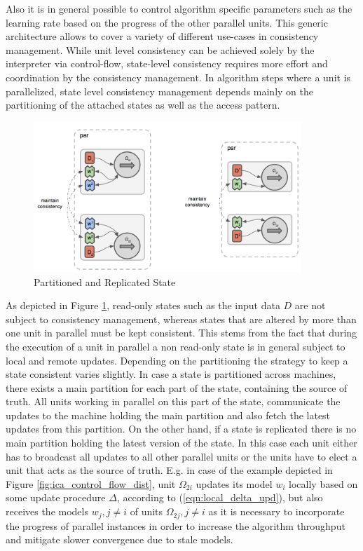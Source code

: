 Also it is in general possible to control algorithm specific parameters such as the learning rate based on the progress of the other parallel units.
This generic architecture allows to cover a variety of different use-cases in consistency management.
While unit level consistency can be achieved solely by the interpreter via control-flow, state-level consistency requires more effort and coordination by the consistency management.
In algorithm steps where a unit is parallelized, state level consistency management depends mainly on the partitioning of the attached states as well as the access pattern.
\begin{figure}[ht]
\centering
\includegraphics[width=0.9\textwidth]{img/par_repl_model.png}
\caption{Partitioned and Replicated State}
\label{fig:par_repl_model}
\end{figure}
As depicted in Figure \ref{fig:par_repl_model}, read-only states such as the input data $D$ are not subject to consistency management, whereas states that are altered by more than one unit in parallel must be kept consistent.
This stems from the fact that during the execution of a unit in parallel a non read-only state is in general subject to local and remote updates.
Depending on the partitioning the strategy to keep a state consistent varies slightly.
In case a state is partitioned across machines, there exists a main partition for each part of the state, containing the source of truth.
All units working in parallel on this part of the state, communicate the updates to the machine holding the main partition and also fetch the latest updates from this partition.
On the other hand, if a state is replicated there is no main partition holding the latest version of the state.
In this case each unit either has to broadcast all updates to all other parallel units or the units have to elect a unit that acts as the source of truth.
E.g. in case of the example depicted in Figure \ref{fig:ica_control_flow_dist}, unit $\Omega_{2i}$ updates its model $w_i$ locally based on some update procedure $\Delta$, according to (\ref{eqn:local_delta_upd}), but also receives the models $w_j, j \neq i$ of units $\Omega_{2j}, j \neq i$ as it is necessary to incorporate the progress of parallel instances in order to increase the algorithm throughput and mitigate slower convergence due to stale models.
